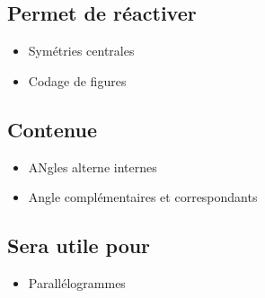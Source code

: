 \subsection{Permet de réactiver}
\begin{itemize}
    \item Symétries centrales
    \item Codage de figures
\end{itemize}

\subsection{Contenue}
\begin{itemize}
    \item ANgles alterne internes
    \item Angle complémentaires et correspondants
\end{itemize}

\subsection{Sera utile pour}
\begin{itemize}
    \item Parallélogrammes
\end{itemize}